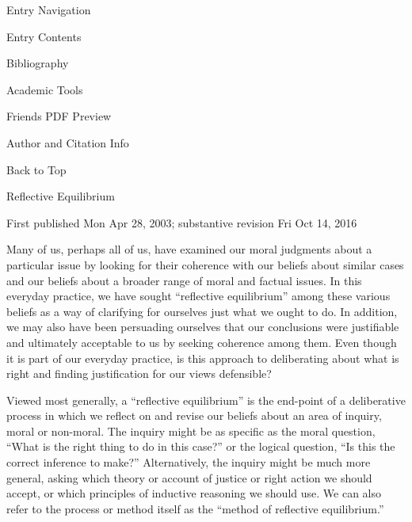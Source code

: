 \documentclass[]{article}
\begin{document}
\hypertarget{article-sidebar}{}
\begin{sticky}

\begin{navbar}

\begin{navbar-inner}

\begin{container}

 Entry Navigation

\hypertarget{article-nav}{}
\begin{nav-collapse}

Entry Contents

Bibliography

Academic Tools

Friends PDF Preview

Author and Citation Info

Back to Top

\end{nav-collapse}

\end{container}

\end{navbar-inner}

\end{navbar}

\end{sticky}

Reflective Equilibrium

\leavevmode\hypertarget{pubinfo}{}%
First published Mon Apr 28, 2003; substantive revision Fri Oct 14, 2016

\hypertarget{preamble}{}
Many of us, perhaps all of us, have examined our moral judgments about a
particular issue by looking for their coherence with our beliefs about
similar cases and our beliefs about a broader range of moral and factual
issues. In this everyday practice, we have sought ``reflective
equilibrium'' among these various beliefs as a way of clarifying for
ourselves just what we ought to do. In addition, we may also have been
persuading ourselves that our conclusions were justifiable and
ultimately acceptable to us by seeking coherence among them. Even though
it is part of our everyday practice, is this approach to deliberating
about what is right and finding justification for our views defensible?

Viewed most generally, a ``reflective equilibrium'' is the end-point of
a deliberative process in which we reflect on and revise our beliefs
about an area of inquiry, moral or non-moral. The inquiry might be as
specific as the moral question, ``What is the right thing to do in this
case?'' or the logical question, ``Is this the correct inference to
make?'' Alternatively, the inquiry might be much more general, asking
which theory or account of justice or right action we should accept, or
which principles of inductive reasoning we should use. We can also refer
to the process or method itself as the ``method of reflective
equilibrium.''
\end{document}
